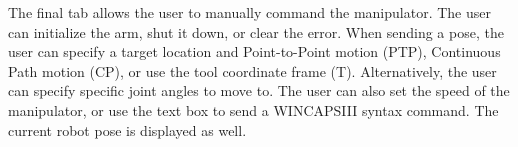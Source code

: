 The final tab allows the user to manually command the manipulator. The user can initialize the arm, shut it down, or clear the error. When sending a pose, the user can specify a target location and Point-to-Point motion (PTP), Continuous Path motion (CP), or use the tool coordinate frame (T). Alternatively, the user can specify specific joint angles to move to. The user can also set the speed of the manipulator, or use the text box to send a WINCAPSIII syntax command. The current robot pose is displayed as well.\\